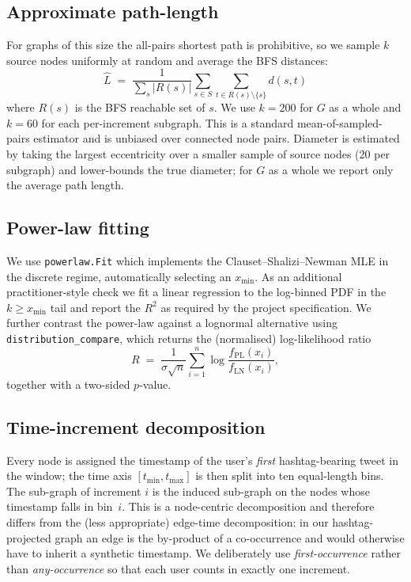 \documentclass[conference]{IEEEtran}
\begin{document}
\subsection{Approximate path-length}
For graphs of this size the all-pairs shortest path is
prohibitive, so we sample $k$ source nodes uniformly at random
and average the BFS distances:
\begin{equation}
  \widehat{L} \;=\;
    \frac{1}{\sum_{s} |R(s)|}
    \sum_{s \in S}\!\sum_{t \in R(s)\setminus\{s\}} d(s,t)
  \label{eq:sample-path}
\end{equation}
where $R(s)$ is the BFS reachable set of $s$.  We use
$k=200$ for $G$ as a whole and $k=60$ for each per-increment
subgraph.  This is a standard mean-of-sampled-pairs estimator
and is unbiased over connected node pairs.  Diameter is
estimated by taking the largest eccentricity over a smaller
sample of source nodes (20 per subgraph) and lower-bounds the
true diameter; for $G$ as a whole we report only the average
path length.

\subsection{Power-law fitting}
We use \texttt{powerlaw.Fit} \cite{alstott2014powerlaw} which
implements the Clauset--Shalizi--Newman MLE
\cite{clauset2009powerlaw} in the discrete regime, automatically
selecting an $x_\text{min}$.  As an additional
practitioner-style check we fit a linear regression to the
log-binned PDF in the $k \ge x_\text{min}$ tail and report the
$R^{2}$ as required by the project specification.  We further
contrast the power-law against a lognormal alternative using
\texttt{distribution\_compare}, which returns the (normalised)
log-likelihood ratio
\begin{equation}
  R \;=\;
    \frac{1}{\sigma\sqrt{n}}
    \sum_{i=1}^{n}\!
      \log\frac{f_\text{PL}(x_i)}{f_\text{LN}(x_i)},
  \label{eq:llr}
\end{equation}
together with a two-sided $p$-value.

\subsection{Time-increment decomposition}
\label{sec:time}
Every node is assigned the timestamp of the user's
\emph{first} hashtag-bearing tweet in the window; the time
axis $[t_\text{min}, t_\text{max}]$ is then split into ten
equal-length bins.  The sub-graph of increment $i$ is the
induced sub-graph on the nodes whose timestamp falls in
bin~$i$.  This is a node-centric decomposition and therefore
differs from the (less appropriate) edge-time decomposition:
in our hashtag-projected graph an edge is the by-product of a
co-occurrence and would otherwise have to inherit a synthetic
timestamp.  We deliberately use \emph{first-occurrence} rather
than \emph{any-occurrence} so that each user counts in
exactly one increment.
\end{document}
